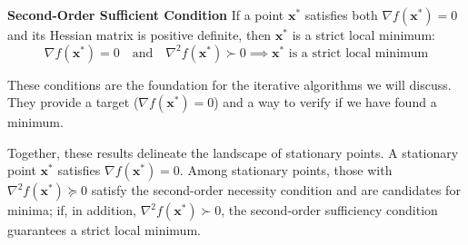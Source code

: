 \begin{definitionBox}
\textbf{Second-Order Sufficient Condition}
If a point $\mathbf{x}^*$ satisfies both $\nabla f(\mathbf{x}^*) = 0$ and its Hessian matrix is positive definite, then $\mathbf{x}^*$ is a strict local minimum:
\begin{equation}
    \nabla f(\mathbf{x}^*) = 0 \quad \text{and} \quad \nabla^2 f(\mathbf{x}^*) \succ 0 \implies \mathbf{x}^* \text{ is a strict local minimum}
\end{equation}
\end{definitionBox}
These conditions are the foundation for the iterative algorithms we will discuss. They provide a target ($\nabla f(\mathbf{x}^*) = 0$) and a way to verify if we have found a minimum.

Together, these results delineate the landscape of stationary points. A stationary point $\mathbf{x}^*$ satisfies $\nabla f(\mathbf{x}^*)=0$. Among stationary points, those with $\nabla^2 f(\mathbf{x}^*)\succeq 0$ satisfy the second-order necessity condition and are candidates for minima; if, in addition, $\nabla^2 f(\mathbf{x}^*)\succ 0$, the second-order sufficiency condition guarantees a strict local minimum.


